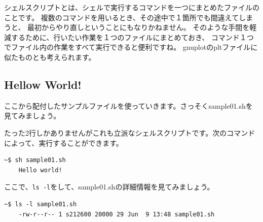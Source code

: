 \documentclass[a4j]{ltjsreport}
\begin{document}
    シェルスクリプトとは、シェルで実行するコマンドを一つにまとめたファイルのことです。
    複数のコマンドを用いるとき、その途中で１箇所でも間違えてしまうと、
    最初からやり直しということにもなりかねません。
    そのような手間を軽減するために、行いたい作業を１つのファイルにまとめておき、
    コマンド１つでファイル内の作業をすべて実行できると便利ですね。
    gnuplotのpltファイルに似たものとも考えられます。

    \subsection{Hellow World!}

    ここから配付したサンプルファイルを使っていきます。さっそくsample01.shを見てみましょう。
    

    たった2行しかありませんがこれも立派なシェルスクリプトです。次のコマンドによって、実行することができます。
    \begin{lstlisting}[numbers=none]
    ~$ sh sample01.sh
    Hello world!
    \end{lstlisting}


    ここで、\texttt{ls -l}をして、sample01.shの詳細情報を見てみましょう。
    \begin{lstlisting}[numbers=none]
    ~$ ls -l sample01.sh
    -rw-r--r-- 1 s212600 20000 29 Jun  9 13:48 sample01.sh
    \end{lstlisting}
\end{document}
